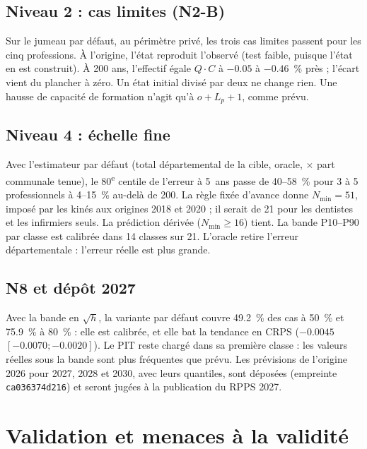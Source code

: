 \subsection{Niveau 2 : cas limites (N2-B)}
Sur le jumeau par défaut, au périmètre privé, les trois cas limites passent pour les cinq
professions. À l'origine, l'état reproduit l'observé (test faible, puisque l'état en est construit).
À 200 ans, l'effectif égale $Q \cdot C$ à $-\num{0.05}$ à $-\num{0.46}$\mesure{}~\% près ; l'écart vient
du plancher à zéro. Un état initial divisé par deux ne change rien. Une hausse de capacité de
formation n'agit qu'à $o + L_p + 1$\mesure{}, comme prévu.

\subsection{Niveau 4 : échelle fine}
Avec l'estimateur par défaut (total départemental de la cible, oracle, $\times$ part communale tenue),
le 80\textsuperscript{e} centile de l'erreur à 5~ans passe de 40--58\mesure{}~\% pour 3 à 5
professionnels à 4--15\mesure{}~\% au-delà de 200. La règle fixée d'avance donne
$N_{\min} = 51$\mesure{}, imposé par les kinés aux origines 2018 et 2020 ; il serait de 21 pour les
dentistes et les infirmiers seuls. La prédiction dérivée ($N_{\min} \ge 16$) tient. La bande
P10--P90 par classe est calibrée dans 14 classes sur 21\mesure{}. L'oracle retire l'erreur
départementale : l'erreur réelle est plus grande.

\subsection{N8 et dépôt 2027}
Avec la bande en $\sqrt h$, la variante par défaut couvre \num{49.2}\mesure{}~\% des cas à 50~\% et
\num{75.9}\mesure{}~\% à 80~\% : elle est calibrée, et elle bat la tendance en CRPS
($\num{-0.0045}$ $[\num{-0.0070} ; \num{-0.0020}]$\mesure{}). Le PIT reste chargé dans sa première
classe : les valeurs réelles sous la bande sont plus fréquentes que prévu. Les prévisions de
l'origine 2026 pour 2027, 2028 et 2030, avec leurs quantiles, sont déposées (empreinte
\texttt{ca036374d216}) et seront jugées à la publication du RPPS 2027.

\section{Validation et menaces à la validité}\label{a3-sec:menaces}
